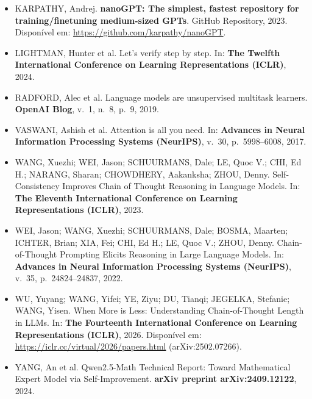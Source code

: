 \documentclass[9pt,conference]{IEEEtran}
\begin{document}
\begin{itemize}[leftmargin=1.1em, itemindent=-1.1em, label={}, itemsep=0.8pt, topsep=1pt]
\item KARPATHY, Andrej. \textbf{nanoGPT: The simplest, fastest repository for training/finetuning medium-sized GPTs}. GitHub Repository, 2023. Dispon\'{i}vel em: \url{https://github.com/karpathy/nanoGPT}.

\item LIGHTMAN, Hunter et al. Let's verify step by step. In: \textbf{The Twelfth International Conference on Learning Representations (ICLR)}, 2024.

\item RADFORD, Alec et al. Language models are unsupervised multitask learners. \textbf{OpenAI Blog}, v.~1, n.~8, p.~9, 2019.

\item VASWANI, Ashish et al. Attention is all you need. In: \textbf{Advances in Neural Information Processing Systems (NeurIPS)}, v.~30, p.~5998--6008, 2017.

\item WANG, Xuezhi; WEI, Jason; SCHUURMANS, Dale; LE, Quoc V.; CHI, Ed H.; NARANG, Sharan; CHOWDHERY, Aakanksha; ZHOU, Denny. Self-Consistency Improves Chain of Thought Reasoning in Language Models. In: \textbf{The Eleventh International Conference on Learning Representations (ICLR)}, 2023.

\item WEI, Jason; WANG, Xuezhi; SCHUURMANS, Dale; BOSMA, Maarten; ICHTER, Brian; XIA, Fei; CHI, Ed H.; LE, Quoc V.; ZHOU, Denny. Chain-of-Thought Prompting Elicits Reasoning in Large Language Models. In: \textbf{Advances in Neural Information Processing Systems (NeurIPS)}, v.~35, p.~24824--24837, 2022.

\item WU, Yuyang; WANG, Yifei; YE, Ziyu; DU, Tianqi; JEGELKA, Stefanie; WANG, Yisen. When More is Less: Understanding Chain-of-Thought Length in LLMs. In: \textbf{The Fourteenth International Conference on Learning Representations (ICLR)}, 2026. Dispon\'{i}vel em: \url{https://iclr.cc/virtual/2026/papers.html} (arXiv:2502.07266).

\item YANG, An et al. Qwen2.5-Math Technical Report: Toward Mathematical Expert Model via Self-Improvement. \textbf{arXiv preprint arXiv:2409.12122}, 2024.

\end{itemize}
\end{document}
